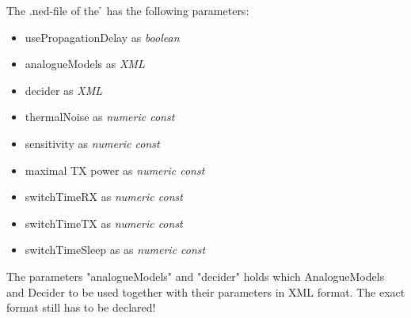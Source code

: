 The .ned-file of the \h{\bp} has the following parameters:

\begin{itemize}
\item usePropagationDelay as \textit{boolean}
\item analogueModels as \textit{XML}
\item decider as \textit{XML}
\item thermalNoise as \textit{numeric const}
\item sensitivity as \textit{numeric const}
\item maximal TX power as \textit{numeric const}
\item switchTimeRX as \textit{numeric const}
\item switchTimeTX as \textit{numeric const}
\item switchTimeSleep as as \textit{numeric const}
\end{itemize}

The parameters "analogueModels" and "decider" holds which AnalogueModels and Decider to be used together with their parameters in XML format. The exact format still has to be declared!






















